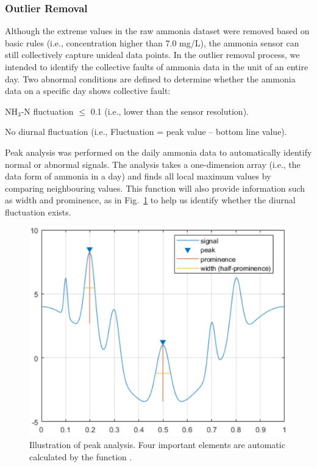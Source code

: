 \subsubsection{Outlier Removal}
Although the extreme values in the raw ammonia dataset were removed based on basic rules (i.e., concentration higher than 7.0 mg/L), the ammonia sensor can still collectively capture unideal data points. In the outlier removal process, we intended to identify the collective faults of ammonia data in the unit of an entire day. Two abnormal conditions are defined to determine whether the ammonia data on a specific day shows collective fault:

\noindent
\begin{myenumerate}
    \item NH$_{3}$-N fluctuation $\le$ 0.1 (i.e., lower than the sensor resolution).
    \item No diurnal fluctuation (i.e., Fluctuation = peak value – bottom line value).
\end{myenumerate}

Peak analysis was performed on the daily ammonia data to automatically identify normal or abnormal signals. The analysis takes a one-dimension array (i.e., the data form of ammonia in a day) and finds all local maximum values by comparing neighbouring values. This function will also provide information such as width and prominence, as in Fig.~\ref{fig:prominence} to help us identify whether the diurnal fluctuation exists.

\begin{figure}[!ht]
    \centering
    \includegraphics[width=0.7\columnwidth]{imgs/pre-processing/prominence.png}
    \caption{Illustration of peak analysis. Four important elements are automatic calculated by the function \citep{mathworksDocumentationFindpeaks2022}.}
    \label{fig:prominence}
 \end{figure}

